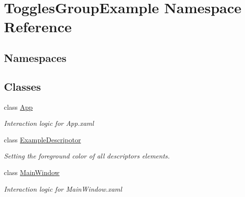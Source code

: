 \hypertarget{namespace_toggles_group_example}{}\section{Toggles\+Group\+Example Namespace Reference}
\label{namespace_toggles_group_example}
\subsection*{Namespaces}
\begin{DoxyCompactItemize}
\end{DoxyCompactItemize}
\subsection*{Classes}
\begin{DoxyCompactItemize}
\item 
class \mbox{\hyperlink{class_toggles_group_example_1_1_app}{App}}
\begin{DoxyCompactList}\small\item\em Interaction logic for App.\+xaml \end{DoxyCompactList}\item 
class \mbox{\hyperlink{class_toggles_group_example_1_1_example_descripotor}{Example\+Descripotor}}
\begin{DoxyCompactList}\small\item\em Setting the foreground color of all descriptor\textquotesingle{}s elements. \end{DoxyCompactList}\item 
class \mbox{\hyperlink{class_toggles_group_example_1_1_main_window}{Main\+Window}}
\begin{DoxyCompactList}\small\item\em Interaction logic for Main\+Window.\+xaml \end{DoxyCompactList}\end{DoxyCompactItemize}
